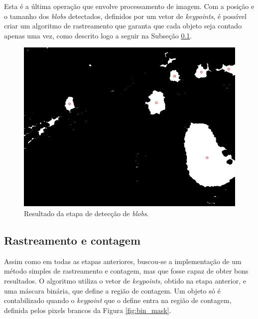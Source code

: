 Esta é a última operação que envolve processamento de imagem. Com a posição e o tamanho dos \textit{blobs} detectados, definidos por um vetor de \textit{keypoints}, é possível criar um algoritmo de rastreamento que garanta que cada objeto seja contado apenas uma vez, como descrito logo a seguir na Subseção \ref{sub:rastreamento_e_contagem}.

\begin{figure}[ht]
  \begin{center}
    \includegraphics[scale=0.5]{imgs/keypoints.png}
  \end{center}
  \caption{Resultado da etapa de detecção de \textit{blobs}.}
  \label{fig:keypoints}
\end{figure}


\subsection{Rastreamento e contagem} %
\label{sub:rastreamento_e_contagem}

Assim como em todas as etapas anteriores, buscou-se a implementação de um método simples de rastreamento e contagem, mas que fosse capaz de obter bons resultados. O algoritmo utiliza o vetor de \textit{keypoints}, obtido na etapa anterior, e uma máscara binária, que define a região de contagem. Um objeto só é contabilizado quando o \textit{keypoint} que o define entra na região de contagem, definida pelos pixels brancos da Figura \ref{fig:bin_mask}.

